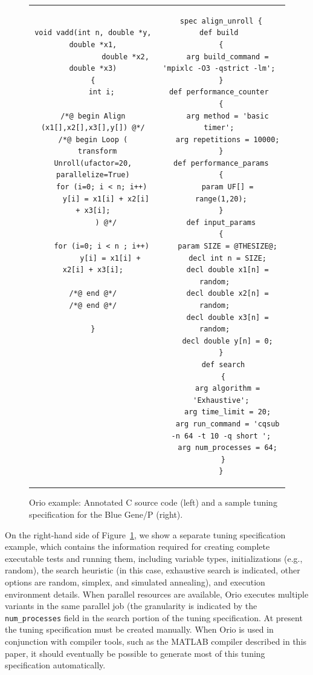 \documentclass[runningheads]{llncs}
\begin{document}
\begin{figure}[htp]
\centering
\begin{tabular}{cc}
\begin{minipage}[b]{.45\textwidth}
\scriptsize
\begin{verbatim}
void vadd(int n, double *y, double *x1,
               double *x2, double *x3)
{
    int i;

/*@ begin Align (x1[],x2[],x3[],y[]) @*/
/*@ begin Loop (
  transform Unroll(ufactor=20, parallelize=True)
    for (i=0; i < n; i++)
      y[i] = x1[i] + x2[i] + x3[i];
      ) @*/

    for (i=0; i < n ; i++)
        y[i] = x1[i] + x2[i] + x3[i];

/*@ end @*/
/*@ end @*/

}












\end{verbatim}
\end{minipage}
&
\begin{minipage}[b]{.45\textwidth}
\scriptsize
\begin{verbatim}
spec align_unroll {
 def build  
 { 
   arg build_command = 'mpixlc -O3 -qstrict -lm'; 
 } 
 def performance_counter  
 { 
   arg method = 'basic timer'; 
   arg repetitions = 10000;
 } 
 def performance_params 
 { 
   param UF[] = range(1,20);
 } 
 def input_params 
 { 
   param SIZE = @THESIZE@;
   decl int n = SIZE;
   decl double x1[n] = random;   
   decl double x2[n] = random;   
   decl double x3[n] = random;   
   decl double y[n] = 0;
 } 
 def search
 {
   arg algorithm = 'Exhaustive';
   arg time_limit = 20;
   arg run_command = 'cqsub -n 64 -t 10 -q short ';
   arg num_processes = 64;
 }
}
\end{verbatim}
\end{minipage}\\
\end{tabular}
\caption{Orio example: Annotated C source code (left) and a sample tuning specification for the Blue Gene/P (right).}
\label{fig:orio-example}
\end{figure}

On the right-hand side of Figure~\ref{fig:orio-example}, we show a separate tuning specification example, which contains the information required for creating complete executable tests and running them, including variable types, initializations (e.g., random), the search heuristic (in this case, exhaustive search is indicated, other options are random, simplex, and simulated annealing), and execution environment details. When parallel resources are available, Orio executes multiple variants in the same parallel job (the granularity is indicated by the \texttt{num\_processes} field in the search portion of the tuning specification. At present the tuning specification must be created manually. When Orio is used in conjunction with compiler tools, such as the MATLAB compiler described in this paper, it should eventually be possible to generate most of this tuning specification automatically.
\end{document}
